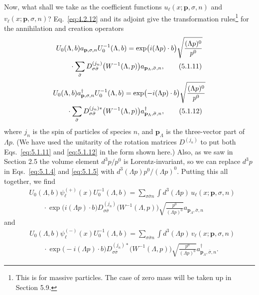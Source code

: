 Now, what shall we take as the coefficient functions
$u_\ell(x;\mathbf{p},\sigma,n)$ and $v_\ell(x;\mathbf{p},\sigma,n)$?
Eq.~\eqref{eq:4.2.12} and its adjoint give the transformation rules\footnote{This is for
massive particles. The case of zero mass will be taken up in Section 5.9.}
for the annihilation and creation operators
\begin{align}
  &U_0(\Lambda,b)a_{\mathbf{p},\sigma,n}U_0^{-1}(\Lambda,b)
  =\exp\bigl(i(\Lambda p)\cdot b\bigr)
  \sqrt{\frac{(\Lambda p)^0}{p^0}}
  \notag\\
  &\qquad\cdot\sum_{\bar\sigma}
  D^{(j_n)}_{\sigma\bar\sigma}\bigl(W^{-1}(\Lambda,p)\bigr)
  a_{\mathbf{p}_\Lambda,\bar\sigma,n},
  \tag{5.1.11}\label{eq:5.1.11}
\end{align}
\begin{align}
  &U_0(\Lambda,b)a^\dagger_{\mathbf{p},\sigma,n}U_0^{-1}(\Lambda,b)
  =\exp\bigl(-i(\Lambda p)\cdot b\bigr)
  \sqrt{\frac{(\Lambda p)^0}{p^0}}
  \notag\\
  &\qquad\cdot\sum_{\bar\sigma}
  D^{(j_n)*}_{\sigma\bar\sigma}\bigl(W^{-1}(\Lambda,p)\bigr)
  a^\dagger_{\mathbf{p}_\Lambda,\bar\sigma,n},
  \tag{5.1.12}\label{eq:5.1.12}
\end{align}
where $j_n$ is the spin of particles of species $n$, and $\mathbf{p}_\Lambda$
is the three-vector part of $\Lambda p$. (We have used the unitarity of the
rotation matrices $D^{(j_n)}$ to put both Eqs.~\eqref{eq:5.1.11} and \eqref{eq:5.1.12} in the
form shown here.) Also, as we saw in Section 2.5 the volume element
$d^3p/p^0$ is Lorentz-invariant, so we can replace $d^3p$ in Eqs.~\eqref{eq:5.1.4}
and \eqref{eq:5.1.5} with $d^3(\Lambda p)p^0/(\Lambda p)^0$. Putting this all together,
we find
\begin{align*}
  &U_0(\Lambda,b)\psi^{(+)}_\ell(x)U_0^{-1}(\Lambda,b)
  =\sum_{\sigma\bar\sigma n}\int d^3(\Lambda p)\,
  u_\ell(x;\mathbf{p},\sigma,n)
  \\
  &\qquad\cdot\exp\bigl(i(\Lambda p)\cdot b\bigr)
  D^{(j_n)}_{\sigma\bar\sigma}\bigl(W^{-1}(\Lambda,p)\bigr)
  \sqrt{\frac{p^0}{(\Lambda p)^0}}
  a_{\mathbf{p}_\Lambda,\bar\sigma,n}
\end{align*}
and
\begin{align*}
  &U_0(\Lambda,b)\psi^{(-)}_\ell(x)U_0^{-1}(\Lambda,b)
  =\sum_{\sigma\bar\sigma n}\int d^3(\Lambda p)\,
  v_\ell(x;\mathbf{p},\sigma,n)
  \\
  &\qquad\cdot\exp\bigl(-i(\Lambda p)\cdot b\bigr)
  D^{(j_n)*}_{\sigma\bar\sigma}\bigl(W^{-1}(\Lambda,p)\bigr)
  \sqrt{\frac{p^0}{(\Lambda p)^0}}
  a^\dagger_{\mathbf{p}_\Lambda,\bar\sigma,n}.
\end{align*}
